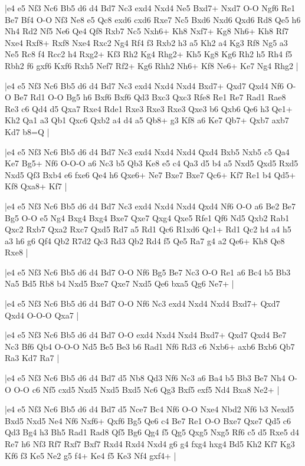 \whitename{}
\blackname{}
\makegametitle
|e4 e5 Nf3 Nc6 Bb5 d6 d4 Bd7 Nc3 exd4 Nxd4 Ne5 Bxd7+ Nxd7 O-O Ngf6 Re1 Be7 Bf4 O-O Nf3 Ne8 e5 Qc8 exd6 cxd6 Rxe7 Nc5 Bxd6 Nxd6 Qxd6 Rd8 Qe5 h6 Nh4 Rd2 Nf5 Ne6 Qe4 Qf8 Rxb7 Nc5 Nxh6+ Kh8 Nxf7+ Kg8 Nh6+ Kh8 Rf7 Nxe4 Rxf8+ Rxf8 Nxe4 Rxc2 Ng4 Rf4 f3 Rxb2 h3 a5 Kh2 a4 Kg3 Rf8 Ng5 a3 Ne5 Rc8 f4 Rcc2 h4 Rxg2+ Kf3 Rh2 Kg4 Rhg2+ Kh5 Kg8 Kg6 Rh2 h5 Rh4 f5 Rbh2 f6 gxf6 Kxf6 Rxh5 Nef7 Rf2+ Kg6 Rhh2 Nh6+ Kf8 Ne6+ Ke7 Ng4 Rhg2  |

\whitename{}
\blackname{}
\makegametitle
|e4 e5 Nf3 Nc6 Bb5 d6 d4 Bd7 Nc3 exd4 Nxd4 Nxd4 Bxd7+ Qxd7 Qxd4 Nf6 O-O Be7 Rd1 O-O Bg5 h6 Bxf6 Bxf6 Qd3 Bxc3 Qxc3 Rfe8 Re1 Re7 Rad1 Rae8 Re3 c6 Qd4 d5 Qxa7 Rxe4 Rde1 Rxe3 Rxe3 Rxe3 Qxe3 b6 Qxb6 Qe6 h3 Qe1+ Kh2 Qa1 a3 Qb1 Qxc6 Qxb2 a4 d4 a5 Qb8+ g3 Kf8 a6 Ke7 Qb7+ Qxb7 axb7 Kd7 b8=Q  |

\whitename{}
\blackname{}
\makegametitle
|e4 e5 Nf3 Nc6 Bb5 d6 d4 Bd7 Nc3 exd4 Nxd4 Nxd4 Qxd4 Bxb5 Nxb5 c5 Qa4 Ke7 Bg5+ Nf6 O-O-O a6 Nc3 b5 Qb3 Ke8 e5 c4 Qa3 d5 b4 a5 Nxd5 Qxd5 Rxd5 Nxd5 Qf3 Bxb4 e6 fxe6 Qe4 h6 Qxe6+ Ne7 Bxe7 Bxe7 Qc6+ Kf7 Re1 b4 Qd5+ Kf8 Qxa8+ Kf7  |

\whitename{}
\blackname{}
\makegametitle
|e4 e5 Nf3 Nc6 Bb5 d6 d4 Bd7 Nc3 exd4 Nxd4 Nxd4 Qxd4 Nf6 O-O a6 Be2 Be7 Bg5 O-O e5 Ng4 Bxg4 Bxg4 Bxe7 Qxe7 Qxg4 Qxe5 Rfe1 Qf6 Nd5 Qxb2 Rab1 Qxc2 Rxb7 Qxa2 Rxc7 Qxd5 Rd7 a5 Rd1 Qc6 R1xd6 Qc1+ Rd1 Qc2 h4 a4 h5 a3 h6 g6 Qf4 Qb2 R7d2 Qc3 Rd3 Qb2 Rd4 f5 Qe5 Ra7 g4 a2 Qe6+ Kh8 Qe8 Rxe8  |

\whitename{}
\blackname{}
\makegametitle
|e4 e5 Nf3 Nc6 Bb5 d6 d4 Bd7 O-O Nf6 Bg5 Be7 Nc3 O-O Re1 a6 Bc4 b5 Bb3 Na5 Bd5 Rb8 b4 Nxd5 Bxe7 Qxe7 Nxd5 Qe6 bxa5 Qg6 Ne7+  |

\whitename{}
\blackname{}
\makegametitle
|e4 e5 Nf3 Nc6 Bb5 d6 d4 Bd7 O-O Nf6 Nc3 exd4 Nxd4 Nxd4 Bxd7+ Qxd7 Qxd4 O-O-O Qxa7  |

\whitename{}
\blackname{}
\makegametitle
|e4 e5 Nf3 Nc6 Bb5 d6 d4 Bd7 O-O exd4 Nxd4 Nxd4 Bxd7+ Qxd7 Qxd4 Be7 Nc3 Bf6 Qb4 O-O-O Nd5 Be5 Be3 b6 Rad1 Nf6 Rd3 c6 Nxb6+ axb6 Bxb6 Qb7 Ra3 Kd7 Ra7  |

\whitename{}
\blackname{}
\makegametitle
|e4 e5 Nf3 Nc6 Bb5 d6 d4 Bd7 d5 Nb8 Qd3 Nf6 Nc3 a6 Ba4 b5 Bb3 Be7 Nh4 O-O O-O c6 Nf5 cxd5 Nxd5 Nxd5 Bxd5 Nc6 Qg3 Bxf5 exf5 Nd4 Bxa8 Ne2+  |

\whitename{}
\blackname{}
\makegametitle
|e4 e5 Nf3 Nc6 Bb5 d6 d4 Bd7 d5 Nce7 Bc4 Nf6 O-O Nxe4 Nbd2 Nf6 b3 Nexd5 Bxd5 Nxd5 Ne4 Nf6 Nxf6+ Qxf6 Bg5 Qe6 c4 Be7 Re1 O-O Bxe7 Qxe7 Qd5 c6 Qd3 Bg4 h3 Bh5 Rad1 Rad8 Qf5 Bg6 Qg4 f5 Qg5 Qxg5 Nxg5 Rf6 c5 d5 Rxe5 d4 Re7 h6 Nf3 Rf7 Rxf7 Bxf7 Rxd4 Rxd4 Nxd4 g6 g4 fxg4 hxg4 Bd5 Kh2 Kf7 Kg3 Kf6 f3 Ke5 Ne2 g5 f4+ Ke4 f5 Ke3 Nf4 gxf4+  |

